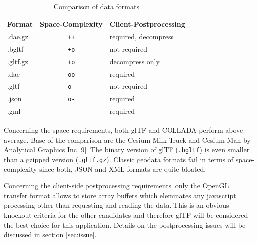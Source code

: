 \documentclass{motivation}
\begin{document}
  \begin{table}[!h]
    \centering
    \begin{tabular}{l|c|l}
      Format & Space-Complexity & Client-Postprocessing\\ \hline
      \cellcolor{yellow!15}.dae.gz & \cellcolor{green!15}\texttt{++} & \cellcolor{red!15}required, decompress \\
      \cellcolor{green!15}.bgltf & \cellcolor{green!15}\texttt{+o} & \cellcolor{green!15}not required \\
      \cellcolor{yellow!15}.gltf.gz & \cellcolor{green!15}\texttt{+o} & \cellcolor{yellow!15}decompress only \\
      \cellcolor{yellow!15}.dae & \cellcolor{yellow!15}\texttt{oo} & \cellcolor{red!15}required \\
      \cellcolor{yellow!15}.gltf & \cellcolor{red!15}\texttt{o-} & \cellcolor{green!15}not required \\
      \cellcolor{red!15}.json & \cellcolor{red!15}\texttt{o-} & \cellcolor{red!15}required \\
      \cellcolor{red!15}.gml & \cellcolor{red!15}\texttt{---} & \cellcolor{red!15}required \\
    \end{tabular}
    \caption{Comparison of data formats}
    \label{tab:dataform}
  \end{table}
  Concerning the space requirements, both glTF and COLLADA perform above average. Base of the comparison are the Cesium Milk Truck and Cesium Man by Analytical Graphics Inc [9]. The binary version of glTF (\texttt{.bgltf}) is even smaller than a gzipped version (\texttt{.gltf.gz}). Classic geodata formats fail in terms of space-complexity since both, JSON and XML formats are quite bloated.\par
  Concerning the client-side postprocessing requirements, only the OpenGL transfer format allows to store array buffers which eleminates any javascript processing other than requesting and reading the data. This is an obvious knockout criteria for the other candidates and therefore glTF will be considered the best choice for this application. Details on the postprocessing issues will be discussed in section \ref{sec:issue}.
\end{document}
